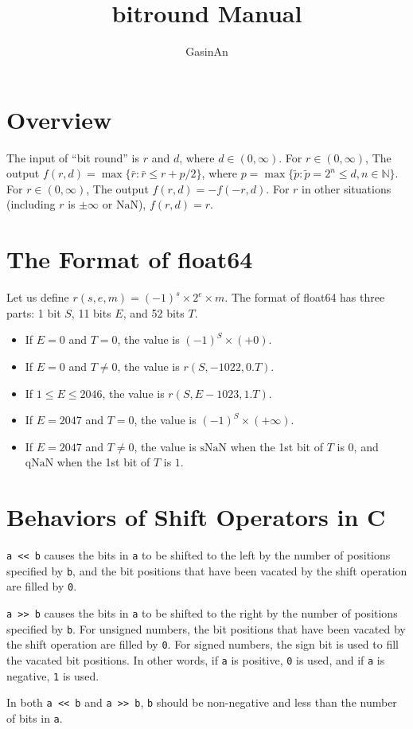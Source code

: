 \documentclass[a4paper,12pt]{article}
\title{bitround Manual}
\author{GasinAn}
\begin{document}
    \maketitle

    \tableofcontents

    \section{Overview}

    The input of ``bit round'' is $r$ and $d$, where $d\in(0,\infty)$. For $r\in(0,\infty)$, The output $f(r,d)=\max\{\bar{r}:\bar{r}\leq r+p/2\}$, where $p=\max\{\tilde{p}:\tilde{p}=2^n\leq d,n\in\mathbb{N}\}$. For $r\in(0,\infty)$, The output $f(r,d)=-f(-r,d)$. For $r$ in other situations (including $r$ is $\pm\infty$ or $\text{NaN}$), $f(r,d)=r$.

    \section{The Format of float64}

    Let us define $r(s,e,m)=(-1)^s\times2^e\times m$. The format of float64 has three parts: 1 bit $S$, 11 bits $E$, and 52 bits $T$.
    \begin{itemize}
        \item If $E=0$ and $T=0$, the value is $(-1)^S\times(+0)$.
        \item If $E=0$ and $T\neq0$, the value is $r(S,-1022,0.T)$.
        \item If $1\leq E\leq2046$, the value is $r(S,E-1023,1.T)$.
        \item If $E=2047$ and $T=0$, the value is $(-1)^S\times(+\infty)$.
        \item If $E=2047$ and $T\neq0$, the value is $\text{sNaN}$ when the 1st bit of $T$ is $0$, and $\text{qNaN}$ when the 1st bit of $T$ is $1$.
    \end{itemize}

    \section{Behaviors of Shift Operators in C}

    \verb|a << b| causes the bits in \verb|a| to be shifted to the left by the number of positions specified by \verb|b|, and the bit positions that have been vacated by the shift operation are filled by \verb|0|.

    \verb|a >> b| causes the bits in \verb|a| to be shifted to the right by the number of positions specified by \verb|b|. For unsigned numbers, the bit positions that have been vacated by the shift operation are filled by \verb|0|. For signed numbers, the sign bit is used to fill the vacated bit positions. In other words, if \verb|a| is positive, \verb|0| is used, and if \verb|a| is negative, \verb|1| is used.

    In both \verb|a << b| and \verb|a >> b|, \verb|b| should be non-negative and less than the number of bits in \verb|a|.
\end{document}
